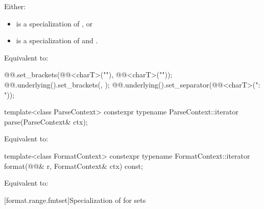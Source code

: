 \begin{itemdescr}
\pnum
\mandates
Either:
\begin{itemize}
\item
{} is a specialization of , or
\item
{} is a specialization of  and
.
\end{itemize}

\pnum
\effects
Equivalent to:
\begin{codeblock}
@@.set_brackets(@@<charT>("{"), @@<charT>("}"));
@@.underlying().set_brackets({}, {});
@@.underlying().set_separator(@@<charT>(": "));
\end{codeblock}
\end{itemdescr}

%
\begin{itemdecl}
template<class ParseContext>
  constexpr typename ParseContext::iterator
    parse(ParseContext& ctx);
\end{itemdecl}

\begin{itemdescr}
\pnum
\effects
Equivalent to: 
\end{itemdescr}

%
\begin{itemdecl}
template<class FormatContext>
  constexpr typename FormatContext::iterator
    format(@@& r, FormatContext& ctx) const;
\end{itemdecl}

\begin{itemdescr}
\pnum
\effects
Equivalent to: 
\end{itemdescr}

[format.range.fmtset]{Specialization of  for sets}

